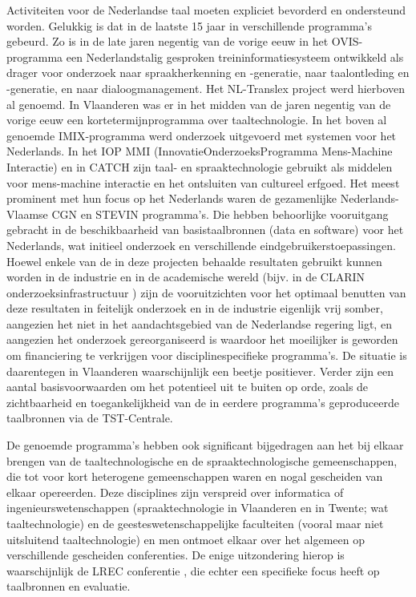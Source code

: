 \begin{multicols}{2}
  Activiteiten voor de Nederlandse taal moeten expliciet bevorderd en ondersteund worden. Gelukkig is dat in de laatste 15 jaar in verschillende programma's gebeurd. Zo is in de late jaren negentig van de vorige eeuw in het OVIS-programma een Nederlandstalig gesproken treininformatiesysteem ontwikkeld als drager voor onderzoek naar spraakherkenning en -generatie, naar taalontleding en -generatie, en naar dialoogmanagement. Het NL-Translex project werd hierboven al genoemd. In Vlaanderen was er in het midden van de jaren negentig van de vorige eeuw een kortetermijnprogramma over taaltechnologie. In het boven al genoemde IMIX-programma werd onderzoek uitgevoerd met systemen voor het Nederlands. In het IOP MMI (InnovatieOnderzoeksProgramma Mens-Machine Interactie) en in CATCH \cite{CATCH}  zijn taal- en spraaktechnologie gebruikt als middelen voor mens-machine interactie en het ontsluiten van cultureel erfgoed. Het meest prominent met hun focus op het Nederlands waren de gezamenlijke Nederlands-Vlaamse CGN en STEVIN programma's. Die hebben behoorlijke vooruitgang gebracht in de beschikbaarheid van basistaalbronnen (data en software) voor het Nederlands, wat initieel onderzoek en verschillende eindgebruikerstoepassingen. Hoewel enkele van de in deze projecten behaalde resultaten gebruikt kunnen worden in de industrie en in de academische wereld (bijv. in de CLARIN onderzoeksinfrastructuur \cite{CLARIN-NL}) zijn de vooruitzichten voor het optimaal benutten van deze resultaten in feitelijk onderzoek en in de industrie eigenlijk vrij somber, aangezien het niet in het aandachtsgebied van de Nederlandse regering ligt, en aangezien het onderzoek gereorganiseerd is waardoor het moeilijker is geworden om financiering te verkrijgen voor disciplinespecifieke programma's. De situatie is daarentegen in Vlaanderen waarschijnlijk een beetje positiever. Verder zijn een aantal basisvoorwaarden om het potentieel uit te buiten op orde, zoals de zichtbaarheid en toegankelijkheid van de in eerdere programma's geproduceerde taalbronnen via de TST-Centrale.

  De genoemde programma's hebben ook significant bijgedragen aan het bij elkaar brengen van de taaltechnologische en de spraaktechnologische gemeenschappen, die tot voor kort heterogene gemeenschappen waren en nogal gescheiden van elkaar opereerden. Deze disciplines zijn verspreid over informatica of ingenieurswetenschappen (spraaktechnologie in Vlaanderen en in Twente; wat taaltechnologie) en de geesteswetenschappelijke faculteiten (vooral maar niet uitsluitend taaltechnologie) en men ontmoet elkaar over het algemeen op verschillende gescheiden conferenties. De enige uitzondering hierop is waarschijnlijk de LREC conferentie \cite{LREC}, die echter een specifieke focus heeft op taalbronnen en evaluatie.


\end{multicols}
